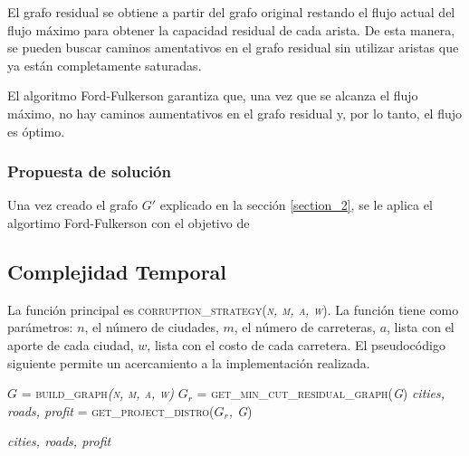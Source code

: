 \documentclass[10pt]{article} %
\begin{document}
	El grafo residual se obtiene a partir del grafo original restando el flujo actual del flujo máximo para obtener la capacidad residual de cada arista. De esta manera, se pueden buscar caminos amentativos en el grafo residual sin utilizar aristas que ya están completamente saturadas.
	
	El algoritmo Ford-Fulkerson garantiza que, una vez que se alcanza el flujo máximo, no hay caminos aumentativos en el grafo residual y, por lo tanto, el flujo es óptimo.
	
	\subsubsection{Propuesta de soluci\'on}
	
	Una vez creado el grafo $G'$ explicado en la secci\'on \ref{section_2}, se le aplica el algortimo Ford-Fulkerson con el objetivo de 
	
	

	
	
	
	
	
	
	
	
	
	\subsection{Complejidad Temporal}
	
	La funci\'on principal es \textsc{corruption\_strategy(\textit{n, m, a, w})}. La funci\'on tiene como par\'ametros: $n$, el n\'umero de ciudades, $m$, el n\'umero de carreteras, $a$, lista con el aporte de cada ciudad, $w$, lista con el costo de cada carretera. El pseudoc\'odigo siguiente permite un acercamiento a la implementaci\'on realizada.
	
	\begin{algorithmic}[1]
		
		\State $G$ = \textsc{build\_graph\textit{(n, m, a, w)}}
		\State $G_r$ =\textsc{ get\_min\_cut\_residual\_graph(\textit{G})}
		\State \textit{cities, roads, profit} = \textsc{get\_project\_distro(\textit{$G_r$, G})}
		
		\Return \textit{cities, roads, profit}
		\EndFunction
	\end{algorithmic}
\end{document}
